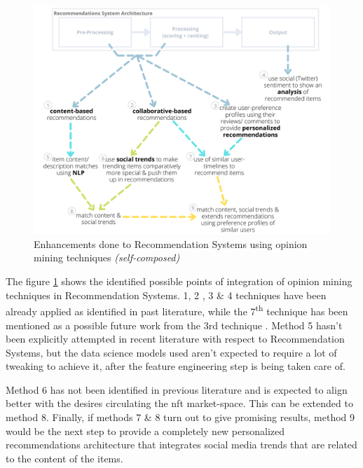 \begin{figure}[h!]
\centering
\includegraphics[width=\textwidth]{images/LR/Enhanced Recommendation Systems.png}
\caption{Enhancements done to Recommendation Systems using opinion mining techniques \textit{(self-composed)}}
\label{fig:recommendation-opinion-mining-enhancements}
\end{figure}

The figure \ref{fig:recommendation-opinion-mining-enhancements} shows the identified possible points of integration of opinion mining techniques in Recommendation Systems.
1, 2 \autocite{linden_amazoncom_2003, larry_history_2019}, 3 \autocite{cheng_hybrid_2020} \& 4 \autocite{ayushi_cross-domain_2018} techniques have been already applied as identified in past literature, while the 7\textsuperscript{th} technique has been mentioned as a possible future work from the 3rd technique \autocite{chen_user_2019}. Method 5 hasn't been explicitly attempted in recent literature with respect to Recommendation Systems, but the data science models used aren't expected to require a lot of tweaking to achieve it, after the feature engineering step is being taken care of.

Method 6 has not been identified in previous literature and is expected to align better with the desires circulating the \gls{nft} market-space. This can be extended to method 8. Finally, if methods 7 \& 8 turn out to give promising results, method 9 would be the next step to provide a completely new personalized recommendations architecture that integrates social media trends that are related to the content of the items.

